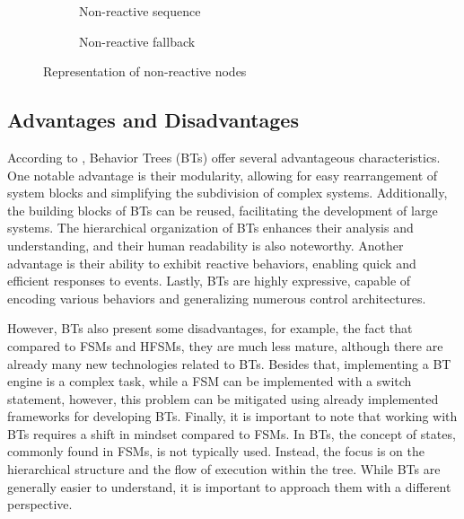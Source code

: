 \begin{figure}[!h]
    \centering
    \begin{subfigure}[b]{.49\linewidth}
        \centering
        \scalebox{1.0} {
            \begin{forest}
            \end{forest}
        }
        \caption{Non-reactive sequence}
    \end{subfigure}
    \hfill
    \begin{subfigure}[b]{.49\linewidth}
        \centering
        \scalebox{1.0} {
            \begin{forest}
            \end{forest}
        }
        \caption{Non-reactive fallback}
    \end{subfigure}
    \caption{Representation of non-reactive nodes}
    \label{fig:background_non_reactive_nodes}
\end{figure}

\subsection{Advantages and Disadvantages}

According to \cite{BTsInRobotics}, Behavior Trees (BTs) offer several advantageous characteristics. One notable advantage is their modularity, allowing for easy rearrangement of system blocks and simplifying the subdivision of complex systems. Additionally, the building blocks of BTs can be reused, facilitating the development of large systems. The hierarchical organization of BTs enhances their analysis and understanding, and their human readability is also noteworthy. Another advantage is their ability to exhibit reactive behaviors, enabling quick and efficient responses to events. Lastly, BTs are highly expressive, capable of encoding various behaviors and generalizing numerous control architectures.

However, BTs also present some disadvantages, for example, the fact that compared to FSMs and HFSMs, they are much less mature, although there are already many new technologies related to BTs. Besides that, implementing a BT engine is a complex task, while a FSM can be implemented with a switch statement, however, this problem can be mitigated using already implemented frameworks for developing BTs. Finally, it is important to note that working with BTs requires a shift in mindset compared to FSMs. In BTs, the concept of states, commonly found in FSMs, is not typically used. Instead, the focus is on the hierarchical structure and the flow of execution within the tree. While BTs are generally easier to understand, it is important to approach them with a different perspective.

